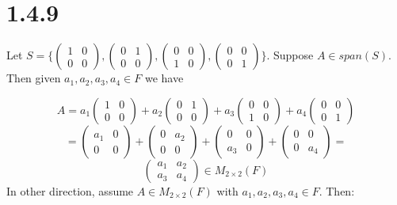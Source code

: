 \documentclass{article}
\begin{document}
\section*{1.4.9}


Let  \(S = \Bigg\{ \begin{pmatrix}
  1 & 0\\ 
  0 & 0
\end{pmatrix},
\begin{pmatrix}
  0 & 1\\ 
  0 & 0
\end{pmatrix},
\begin{pmatrix}
  0 & 0\\ 
  1 & 0
\end{pmatrix},
\begin{pmatrix}
  0 & 0\\ 
  0 & 1
\end{pmatrix}
\Bigg\}\). Suppose \(A \in span(S)\). Then given \(a_{1}, a_{2}, a_{3}, a_{4} \in F\) we have

\begin{equation*}
    A = a_{1}\begin{pmatrix} 1 & 0\\ 0 & 0 \end{pmatrix} + a_{2}\begin{pmatrix} 0 & 1\\ 0 & 0 \end{pmatrix}  + a_{3}\begin{pmatrix} 0 & 0\\ 1 & 0 \end{pmatrix}  + a_{4}\begin{pmatrix} 0 & 0\\ 0 & 1 \end{pmatrix} 
\end{equation*}
\begin{equation*}
    = \begin{pmatrix} a_{1} & 0\\ 0 & 0 \end{pmatrix} + \begin{pmatrix} 0 & a_{2}\\ 0 & 0 \end{pmatrix}  + \begin{pmatrix} 0 & 0\\ a_{3} & 0 \end{pmatrix}  + \begin{pmatrix} 0 & 0\\ 0 & a_{4} \end{pmatrix} =
\end{equation*}
\begin{equation*}
    \begin{pmatrix}
  a_{1} & a_{2}\\ 
  a_{3} & a_{4}
\end{pmatrix} \in M_{2 \times 2}(F)
\end{equation*}
In other direction, assume \(A \in M_{2 \times 2}(F) \) with \(a_{1}, a_{2}, a_{3}, a_{4} \in F\). Then:
\end{document}
